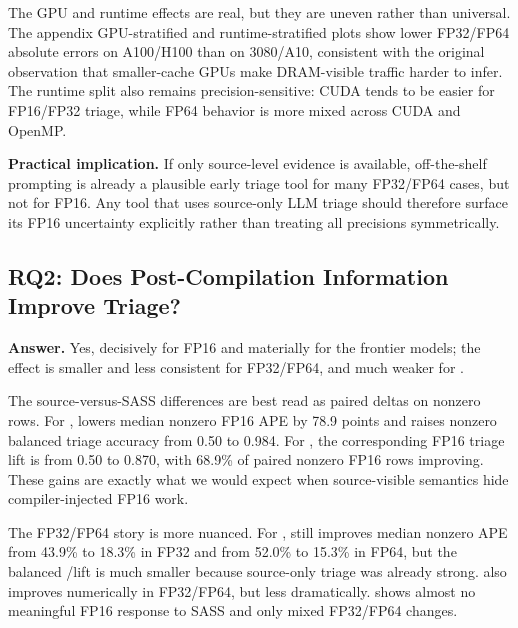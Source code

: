 The GPU and runtime effects are real, but they are uneven rather than universal.
The appendix GPU-stratified and runtime-stratified plots show lower FP32/FP64 absolute errors on A100/H100 than on 3080/A10, consistent with the original observation that smaller-cache GPUs make DRAM-visible traffic harder to infer.
The runtime split also remains precision-sensitive: CUDA tends to be easier for FP16/FP32 triage, while FP64 behavior is more mixed across CUDA and OpenMP.

\textbf{Practical implication.}
If only source-level evidence is available, off-the-shelf prompting is already a plausible early triage tool for many FP32/FP64 cases, but not for FP16.
Any tool that uses source-only LLM triage should therefore surface its FP16 uncertainty explicitly rather than treating all precisions symmetrically.

\subsection{RQ2: Does Post-Compilation Information Improve Triage?}

\textbf{Answer.}
Yes, decisively for FP16 and materially for the frontier models; the effect is smaller and less consistent for FP32/FP64, and much weaker for \gptoss.

The source-versus-SASS differences are best read as paired deltas on nonzero rows.
For \opus, \sourcesass lowers median nonzero FP16 APE by 78.9 points and raises nonzero balanced triage accuracy from 0.50 to 0.984.
For \gptfivefour, the corresponding FP16 triage lift is from 0.50 to 0.870, with 68.9\% of paired nonzero FP16 rows improving.
These gains are exactly what we would expect when source-visible semantics hide compiler-injected FP16 work.

The FP32/FP64 story is more nuanced.
For \opus, \sourcesass still improves median nonzero APE from 43.9\% to 18.3\% in FP32 and from 52.0\% to 15.3\% in FP64, but the balanced \bandwidthbound/\computebound lift is much smaller because source-only triage was already strong.
\gptfivefour also improves numerically in FP32/FP64, but less dramatically.
\gptoss shows almost no meaningful FP16 response to SASS and only mixed FP32/FP64 changes.

